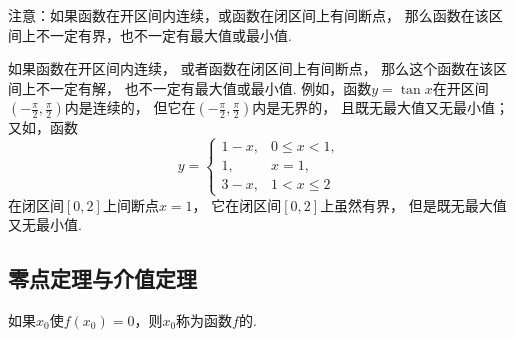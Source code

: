 注意：如果函数在开区间内连续，或函数在闭区间上有间断点，
那么函数在该区间上不一定有界，也不一定有最大值或最小值.

如果函数在开区间内连续，
或者函数在闭区间上有间断点，
那么这个函数在该区间上不一定有解，
也不一定有最大值或最小值.
例如，函数\(y=\tan x\)在开区间\(\left(-\frac{\pi}{2},\frac{\pi}{2}\right)\)内是连续的，
但它在\(\left(-\frac{\pi}{2},\frac{\pi}{2}\right)\)内是无界的，
且既无最大值又无最小值；
又如，函数\begin{equation*}
	y=\left\{ \begin{array}{ll}
		1-x, & 0\leq x<1, \\
		1, & x=1, \\
		3-x, & 1<x\leq2
	\end{array} \right.
\end{equation*}在闭区间\([0,2]\)上间断点\(x=1\)，
它在闭区间\([0,2]\)上虽然有界，
但是既无最大值又无最小值.

\subsection{零点定理与介值定理}
\begin{definition}
如果\(x_0\)使\(f(x_0) = 0\)，则\(x_0\)称为函数\(f\)的.
\end{definition}

